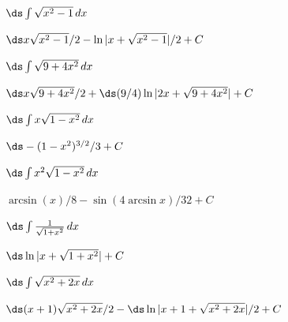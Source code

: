 \begin{enumialphparenastyle}

%

\begin{ex}
 $\ds\int\sqrt{x^2-1}\,dx$
\begin{sol}
 $\ds x\sqrt{x^2-1}/2-\ln|x+\sqrt{x^2-1}|/2+C$
\end{sol}
\end{ex}

\begin{ex}
 $\ds\int\sqrt{9+4x^2}\,dx$
\begin{sol}
 $\ds x\sqrt{9+4x^2}/2+\hbox{$\ds(9/4)\ln|2x+\sqrt{9+4x^2}|+C$}$
\end{sol}
\end{ex}

\begin{ex}
 $\ds\int x\sqrt{1-x^2}\,dx$
\begin{sol}
 $\ds -(1-x^2)^{3/2}/3+C$
\end{sol}
\end{ex}

\begin{ex}
 $\ds\int x^2\sqrt{1-x^2}\,dx$
\begin{sol}
 $\arcsin(x)/8-\sin(4\arcsin x)/32+C$
\end{sol}
\end{ex}

\begin{ex}
 $\ds\int{1\over\sqrt{1+x^2}}\,dx$
\begin{sol}
 $\ds \ln|x+\sqrt{1+x^2}|+C$
\end{sol}
\end{ex}

\begin{ex}
 $\ds\int\sqrt{x^2+2x}\,dx$
\begin{sol}
 $\ds (x+1)\sqrt{x^2+2x}/2-\hbox{$\ds\ln|x+1+\sqrt{x^2+2x}|/2+C$}$
\end{sol}
\end{ex}


\end{enumialphparenastyle}
